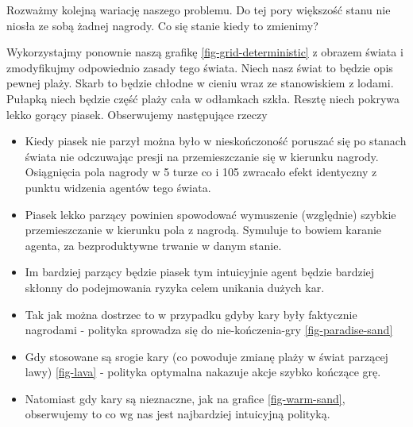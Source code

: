 \documentclass[10pt,a4paper]{book}
\begin{document}
Rozważmy kolejną wariację naszego problemu. Do tej pory większość stanu nie niosła ze sobą żadnej nagrody. Co się stanie kiedy to zmienimy?

\begin{problem*}
Wykorzystajmy ponownie naszą grafikę \ref{fig-grid-deterministic} z obrazem świata i zmodyfikujmy odpowiednio zasady tego świata.
Niech nasz świat to będzie opis pewnej plaży. Skarb to będzie chłodne w cieniu wraz ze stanowiskiem z lodami. Pułapką niech będzie część plaży cała w odłamkach szkła. Resztę niech pokrywa lekko gorący piasek. Obserwujemy następujące rzeczy

\begin{itemize}
\item Kiedy piasek nie parzył można było w nieskończoność poruszać się po stanach świata nie odczuwając presji na przemieszczanie się w kierunku nagrody. Osiągnięcia pola nagrody w 5 turze co i 105 zwracało efekt identyczny z punktu widzenia agentów tego świata.
\item Piasek lekko parzący powinien spowodować wymuszenie (względnie) szybkie przemieszczanie w kierunku pola z nagrodą. Symuluje to bowiem karanie agenta, za bezproduktywne trwanie w danym stanie.
\item Im bardziej parzący będzie piasek tym intuicyjnie agent będzie bardziej skłonny do podejmowania ryzyka celem unikania dużych kar.
\item Tak jak można dostrzec to w przypadku gdyby kary były faktycznie nagrodami - polityka sprowadza się do nie-kończenia-gry \ref{fig-paradise-sand}
\item Gdy stosowane są srogie kary (co powoduje zmianę plaży w świat parzącej lawy) \ref{fig-lava} - polityka optymalna nakazuje akcje szybko kończące grę.
\item Natomiast gdy kary są nieznaczne, jak na grafice \ref{fig-warm-sand}, obserwujemy to co wg nas jest najbardziej intuicyjną polityką.
\end{itemize}
\end{problem*}
\end{document}
